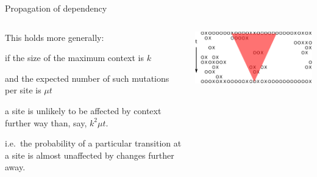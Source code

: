 \documentclass[smaller]{beamer}
\begin{document}
\begin{frame}{Propagation of dependency}

  \begin{columns}[c]
    \begin{column}{.5\textwidth}

      This holds more generally:

      \vspace{1em}

      if the size of the maximum context is $k$

      \vspace{1em}

      and the expected number of such mutations per site is $\mu t$

      \vspace{1em}

      a site is unlikely to be affected by context further way than, say, $k^2 \mu t$.

      \vspace{1em}

      i.e.\ the probability of a particular transition at a site is almost unaffected by changes further away.

    \end{column}
    \begin{column}{.5\textwidth}

      \includegraphics[width=\textwidth]{../../writeup-plots/talk-tasep-fig-3}

    \end{column}
  \end{columns}

\end{frame}
\end{document}
